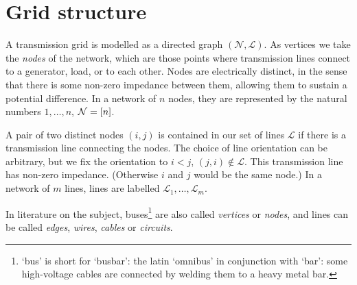 \documentclass[main.tex]{subfiles}
\begin{document}
\section{Grid structure}
A transmission grid is modelled as a directed graph $(\mathcal{N},\mathcal{L})$. As vertices we take the \emph{nodes} of the network, which are those points where transmission lines connect to a generator, load, or to each other. Nodes are electrically distinct, in the sense that there is some non-zero impedance between them, allowing them to sustain a potential difference. In a network of $n$ nodes, they are represented by the natural numbers $1,\dots,n$, \ie $\mathcal{N}=[n]$.

A pair of two distinct nodes $(i,j)$ is contained in our set of lines $\mathcal{L}$ if there is a transmission line connecting the nodes. The choice of line orientation can be arbitrary, but we fix the orientation to $i<j$, \ie $(j,i) \notin \mathcal{L}$. This transmission line has non-zero impedance. (Otherwise $i$ and $j$ would be the same node.) In a network of $m$ lines, lines are labelled $\mathcal{L}_1, \dots, \mathcal{L}_m$. 

In literature on the subject,  buses\footnote{`bus' is short for `busbar': the latin `omnibus' in conjunction with `bar': some high-voltage cables are connected by welding them to a heavy metal bar.} are also called \emph{vertices} or \emph{nodes}, and lines can be called \emph{edges}, \emph{wires}, \emph{cables} or \emph{circuits}.
\end{document}
